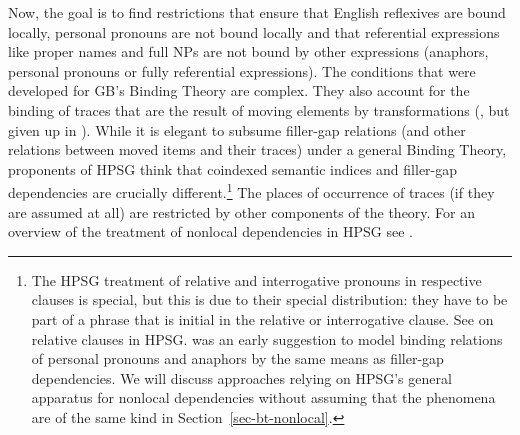 \documentclass[output=paper
 	        ,biblatex
                ,babelshorthands
                ,newtxmath
                ,draftmode
                ,colorlinks, citecolor=brown
]{langscibook}
\begin{document}
Now, the goal is to find restrictions that ensure that English reflexives are bound locally, personal
pronouns are not bound locally and that referential expressions like proper names and full NPs are
not bound by other expressions (anaphors, personal pronouns or fully referential expressions).
 The conditions that were developed for
GB's Binding Theory are complex. They also account for the binding of traces that are the result of
moving elements by transformations (\citealp{Chomsky81a}, but given up in
\citealp{Chomsky86a}).\label{page-traces-binding} While it is elegant to subsume filler-gap relations (and other relations
between moved items and their traces) under a general Binding Theory, proponents of HPSG think that
coindexed semantic indices and filler-gap
dependencies are crucially different.\footnote{\label{binding-fn-percolation-of-indices}%
The HPSG treatment of relative and interrogative pronouns in respective clauses is special, but this
is due to their special distribution: they have to be part of a phrase that is initial in the
relative or interrogative clause. 
See  on relative
clauses in HPSG. %
 was an early suggestion to model binding relations of personal pronouns and anaphors by
the same means as filler-gap dependencies. We will discuss approaches relying on HPSG's general apparatus
for nonlocal dependencies without assuming that the phenomena are of the same kind in Section~\ref{sec-bt-nonlocal}. 
} The places of occurrence of traces (if they are assumed at all)
are restricted by other components of the theory. For an overview of the treatment of nonlocal
dependencies in HPSG see .
\end{document}
